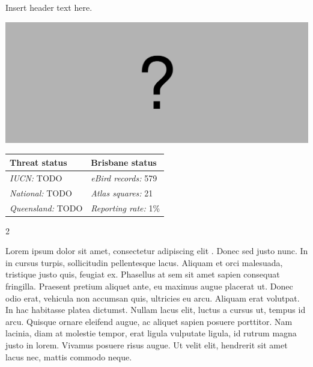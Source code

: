 \documentclass[12pt,openany,oneside]{book}
\let\origfigure\figure
\let\endorigfigure\endfigure
\renewenvironment{figure}[1][2] {
  \expandafter\origfigure\expandafter[H]
} {
  \endorigfigure
}
\let\Begin\begin
\let\End\end
\theoremstyle{definition}
\theoremstyle{definition}
\theoremstyle{definition}
\theoremstyle{remark}
\begin{document}

Insert header text here.

\begin{figure}
\centering
\includegraphics[width=\textwidth,keepaspectratio=true]{assets/misc/missing-profile.png}
\caption{Insert caption here.}
\end{figure}

\begin{tabu} to 
\toprule
Threat status & Brisbane status\\
\midrule
\textit{IUCN:} TODO & \textit{eBird records:} 579\\
\textit{National:} TODO & \textit{Atlas squares:} 21\\
\textit{Queensland:} TODO & \textit{Reporting rate:} 1\%\\
\bottomrule
\end{tabu} 
\vspace{0.15cm}

\Begin{multicols}{2}

Lorem ipsum dolor sit amet, consectetur adipiscing elit
\citep{rexample1, rexample2, rexample3}. Donec sed justo nunc. In in
cursus turpis, sollicitudin pellentesque lacus. Aliquam et orci
malesuada, tristique justo quis, feugiat ex. Phasellus at sem sit amet
sapien consequat fringilla. Praesent pretium aliquet ante, eu maximus
augue placerat ut. Donec odio erat, vehicula non accumsan quis,
ultricies eu arcu. Aliquam erat volutpat. In hac habitasse platea
dictumst. Nullam lacus elit, luctus a cursus ut, tempus id arcu. Quisque
ornare eleifend augue, ac aliquet sapien posuere porttitor. Nam lacinia,
diam at molestie tempor, erat ligula vulputate ligula, id rutrum magna
justo in lorem. Vivamus posuere risus augue. Ut velit elit, hendrerit
sit amet lacus nec, mattis commodo neque.

\End{multicols}

\clearpage
\end{document}

